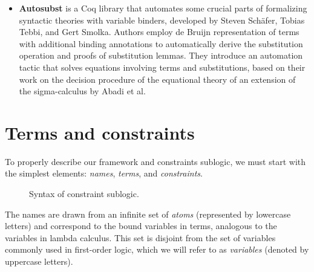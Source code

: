 \documentclass[english, mgr]{iithesis}
\renewcommand{\it}[1]{\textit{#1}}
\begin{document}
\begin{itemize}
\item \textbf{Autosubst}\cite{autosubst}
is a Coq library that automates some crucial parts of formalizing syntactic theories with variable binders,
developed by Steven Schäfer, Tobias Tebbi, and Gert Smolka.
Authors employ de Bruijn representation of terms with additional binding annotations
to automatically derive the substitution operation and proofs of substitution lemmas.
They introduce an automation tactic that solves equations involving terms and substitutions,
based on their work on the decision procedure of the equational theory of
an extension of the sigma-calculus by Abadi et al\cite{sigma-calculus}.
\\

\end{itemize}
\chapter{Terms and constraints}
To properly describe our framework and constraints sublogic,
we must start with the simplest elements: \it{names}, \it{terms}, and \it{constraints}.

\begin{figure}[htbp]
  \centering
  \caption{Syntax of constraint sublogic.}
  \label{fig:terms-constraints-syntax}
\end{figure}
The names are drawn from an infinite set of \it{atoms} (represented by lowercase letters)
and correspond to the bound variables in terms, analogous to the variables in lambda calculus.
This set is disjoint from the set of variables commonly used in first-order logic,
which we will refer to as \it{variables} (denoted by uppercase letters).
\end{document}
